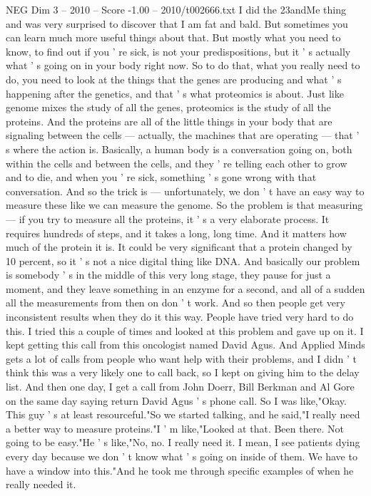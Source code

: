 \begin{textsample}{NEG Dim 3 – 2010 – Score -1.00 – 2010/t002666.txt}
I did the 23andMe thing and was very surprised to discover that I am fat and bald.
But sometimes you can learn much more useful things about that.
But mostly what you need to know, to find out if you ' re sick, is not your predispositions, but it ' s actually what ' s going on in your body right now.
So to do that, what you really need to do, you need to look at the things that the genes are producing and what ' s happening after the genetics, and that ' s what proteomics is about.
Just like genome mixes the study of all the genes, proteomics is the study of all the proteins.
And the proteins are all of the little things in your body that are signaling between the cells — actually, the machines that are operating — that ' s where the action is.
Basically, a human body is a conversation going on, both within the cells and between the cells, and they ' re telling each other to grow and to die, and when you ' re sick, something ' s gone wrong with that conversation.
And so the trick is — unfortunately, we don ' t have an easy way to measure these like we can measure the genome.
So the problem is that measuring — if you try to measure all the proteins, it ' s a very elaborate process.
It requires hundreds of steps, and it takes a long, long time.
And it matters how much of the protein it is.
It could be very significant that a protein changed by 10 percent, so it ' s not a nice digital thing like DNA.
And basically our problem is somebody ' s in the middle of this very long stage, they pause for just a moment, and they leave something in an enzyme for a second, and all of a sudden all the measurements from then on don ' t work.
And so then people get very inconsistent results when they do it this way.
People have tried very hard to do this.
I tried this a couple of times and looked at this problem and gave up on it.
I kept getting this call from this oncologist named David Agus.
And Applied Minds gets a lot of calls from people who want help with their problems, and I didn ' t think this was a very likely one to call back, so I kept on giving him to the delay list.
And then one day, I get a call from John Doerr, Bill Berkman and Al Gore on the same day saying return David Agus ' s phone call.
So I was like,"Okay.
This guy ' s at least resourceful."So we started talking, and he said,"I really need a better way to measure proteins."I ' m like,"Looked at that.
Been there.
Not going to be easy."He ' s like,"No, no.
I really need it.
I mean, I see patients dying every day because we don ' t know what ' s going on inside of them.
We have to have a window into this."And he took me through specific examples of when he really needed it.

\end{textsample}
